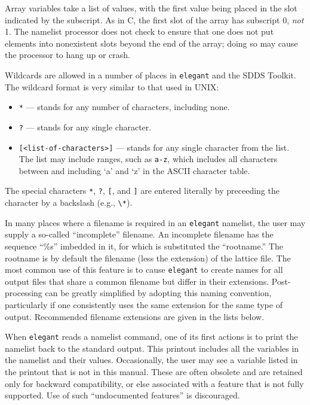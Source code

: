 \documentclass[11pt]{article}
\begin{document}
Array variables take a list of values, with the first value being
placed in the slot indicated by the subscript.  As in C, the first
slot of the array has subscript 0, {\em not} 1.  The namelist
processor does not check to ensure that one does not put elements into
nonexistent slots beyond the end of the array; doing so may cause the
processor to hang up or crash.

Wildcards are allowed in a number of places in {\tt elegant} and the SDDS Toolkit.  The wildcard format is
very similar to that used in UNIX:
\begin{itemize}
\item \verb|*| --- stands for any number of characters, including none.
\item \verb|?| --- stands for any single character.
\item \verb|[<list-of-characters>]| --- stands for any single character from the list.  The list may include
ranges, such as \verb|a-z|, which includes all characters between and including `a' and `z' in the ASCII
character table.
\end{itemize}
The special characters \verb|*|, \verb|?|, \verb|[|, and \verb|]| are entered literally by preceeding the character by a
backslash (e.g., \verb|\*|).

In many places where a filename is required in an {\tt elegant}
namelist, the user may supply a so-called ``incomplete'' filename.  An
incomplete filename has the sequence ``\%s'' imbedded in it, for which
is substituted the ``rootname.''  The rootname is by default the
filename (less the extension) of the lattice file.  The most common
use of this feature is to cause {\tt elegant} to create names for all
output files that share a common filename but differ in their
extensions.  Post-processing can be greatly simplified by adopting
this naming convention, particularly if one consistently uses the same
extension for the same type of output.  Recommended filename
extensions are given in the lists below.

When {\tt elegant} reads a namelist command, one of its first actions
is to print the namelist back to the standard output.  This printout
includes all the variables in the namelist and their values.
Occasionally, the user may see a variable listed in the printout that
is not in this manual.  These are often obsolete and are retained only
for backward compatibility, or else associated with a feature that is
not fully supported.  Use of such ``undocumented features'' is
discouraged.
\end{document}
